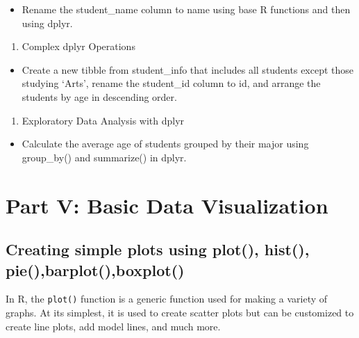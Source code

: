 \documentclass[
]{book}
\providecommand{\tightlist}{%
  \setlength{\itemsep}{0pt}\setlength{\parskip}{0pt}}
\begin{document}
\begin{itemize}
\tightlist
\item
  Rename the student\_name column to name using base R functions and then using dplyr.
\end{itemize}

\begin{enumerate}
\def\labelenumi{\arabic{enumi}.}
\setcounter{enumi}{5}
\tightlist
\item
  Complex dplyr Operations
\end{enumerate}

\begin{itemize}
\tightlist
\item
  Create a new tibble from student\_info that includes all students except those studying `Arts', rename the student\_id column to id, and arrange the students by age in descending order.
\end{itemize}

\begin{enumerate}
\def\labelenumi{\arabic{enumi}.}
\setcounter{enumi}{6}
\tightlist
\item
  Exploratory Data Analysis with dplyr
\end{enumerate}

\begin{itemize}
\tightlist
\item
  Calculate the average age of students grouped by their major using group\_by() and summarize() in dplyr.
\end{itemize}

\chapter*{Part V: Basic Data Visualization}\label{part-v-basic-data-visualization}

\section*{Creating simple plots using plot(), hist(), pie(),barplot(),boxplot()}\label{creating-simple-plots-using-plot-hist-piebarplotboxplot}

In R, the \texttt{plot()} function is a generic function used for making a variety of graphs. At its simplest, it is used to create scatter plots but can be customized to create line plots, add model lines, and much more.
\end{document}
